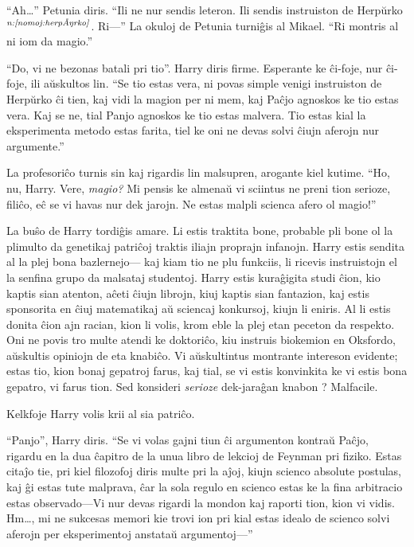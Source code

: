 ``Ah\ldots{}'' Petunia diris. ``Ili ne nur sendis leteron. Ili sendis
instruiston de Herpŭrko$^{\textit{n:\ref{nomoj:herpŭrko}}}$. Ri—'' La okuloj de Petunia
turniĝis al Mikael. ``Ri montris al ni iom da magio.''

``Do, vi ne bezonas batali pri tio''. Harry diris firme. Esperante ke
ĉi-foje, nur ĉi-foje, ili aŭskultos lin. ``Se tio estas vera, ni povas
simple venigi instruiston de Herpŭrko ĉi tien, kaj vidi la magion per
ni mem, kaj Paĉjo agnoskos ke tio estas vera. Kaj se ne, tial Panjo
agnoskos ke tio estas malvera. Tio estas kial la eksperimenta metodo
estas farita, tiel ke oni ne devas solvi ĉiujn aferojn nur
argumente.''

La profesoriĉo turnis sin kaj rigardis lin malsupren, arogante kiel
kutime.  ``Ho, nu, Harry. Vere, \emph{magio?} Mi pensis ke almenaŭ vi sciintus
ne preni tion serioze, filiĉo, eĉ se vi havas nur dek jarojn. Ne estas
malpli scienca afero ol magio!''

La buŝo de Harry tordiĝis amare. Li estis traktita bone, probable pli
bone ol la plimulto da genetikaj patriĉoj traktis iliajn proprajn
infanojn.  Harry estis sendita al la plej bona bazlernejo— kaj kiam
tio ne plu funkciis, li ricevis instruistojn el la senfina grupo da
malsataj studentoj. Harry estis kuraĝigita studi ĉion, kio kaptis sian
atenton, aĉeti ĉiujn librojn, kiuj kaptis sian fantazion, kaj estis
sponsorita en ĉiuj matematikaj aŭ sciencaj konkursoj, kiujn li
eniris. Al li estis donita ĉion ajn racian, kion li volis, krom eble
la plej etan peceton da respekto. Oni ne povis tro multe atendi ke
doktoriĉo, kiu instruis biokemion en Oksfordo, aŭskultis opiniojn de
eta knabiĉo. Vi aŭskultintus montrante intereson evidente; estas tio,
kion bonaj gepatroj farus, kaj tial, se vi estis konvinkita ke vi
estis bona gepatro, vi farus tion.  Sed konsideri \emph{serioze}
dek-jaraĝan knabon ? Malfacile.

Kelkfoje Harry volis krii al sia patriĉo.

``Panjo'', Harry diris. ``Se vi volas gajni tiun ĉi argumenton kontraŭ
Paĉjo, rigardu en la dua ĉapitro de la unua libro de lekcioj de
Feynman pri fiziko. Estas citaĵo tie, pri kiel filozofoj diris multe
pri la aĵoj, kiujn scienco absolute postulas, kaj ĝi estas tute
malprava, ĉar la sola regulo en scienco estas ke la fina arbitracio
estas observado—Vi nur devas rigardi la mondon kaj raporti tion, kion
vi vidis.  Hm\ldots{}, mi ne sukcesas memori kie trovi ion pri kial
estas idealo de scienco solvi aferojn per eksperimentoj anstataŭ
argumentoj—''

